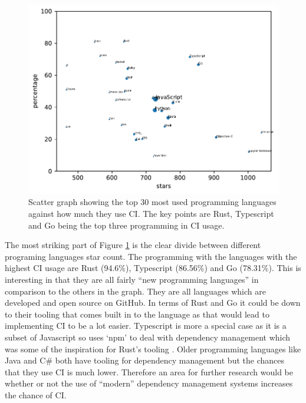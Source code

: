 \documentclass[10pt,conference]{IEEEtran}
\begin{document}
\begin{figure}[!h]
  \centering
  \includegraphics[width=.8\textwidth]{../src/results/languages-scatter-CI.pdf}
  \caption{Scatter graph showing the top 30 most used programming languages against how much they use CI. The key points are Rust, Typescript and Go being the top three programming in CI usage.}
  \label{graph:scatter_langauges_CI}
\end{figure}


The most striking part of Figure \ref{graph:scatter_langauges_CI} is the clear divide between different programing languages star count. The programming with the languages with the highest CI usage are Rust (94.6\%), Typescript (86.56\%) and Go (78.31\%). This is interesting in that they are all fairly \enquote{new programming languages} in comparison to the others in the graph. They are all languages which are developed and open source on GitHub. In terms of Rust and Go it could be down to their tooling that comes built in to the language as that would lead to implementing CI to be a lot easier. Typescript is more a special case as it is a subset of Javascript so uses `npm' to deal with dependency management which was some of the inspiration for Rust's tooling \citet{RustBlogCargo}. Older programming languages like Java and C\# both have tooling for dependency management but the chances that they use CI is much lower. Therefore an area for further research would be whether or not the use of \enquote{modern} dependency management systems increases the chance of CI.
\end{document}
